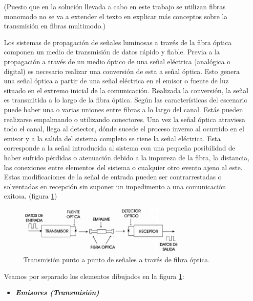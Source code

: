 \begin{itemize}
 (Puesto que en la solución llevada a cabo en este trabajo se utilizan fibras monomodo no se va a extender el texto en explicar más conceptos sobre la transmisión en fibras multimodo.)
 
 Los sistemas de propagación de señales luminosas a través de la fibra óptica componen un medio de transmisión de datos rápido y fiable. Previa a la propagación a través de un medio óptico de una señal eléctrica (analógica o digital) es necesario realizar una conversión de esta a señal óptica. Esto genera una señal óptica a partir de una señal eléctrica en el emisor o fuente de luz situado en el extremo inicial de la comunicación. Realizada la conversión, la señal es transmitida a lo largo de la fibra óptica. Según las características del escenario puede haber una o varias uniones entre fibras a lo largo del canal. Estás pueden realizarse empalmando o utilizando conectores. Una vez la señal óptica atraviesa todo el canal, llega al detector, dónde sucede el proceso inverso al ocurrido en el emisor y a la salida del sistema completo se tiene la señal eléctrica. Esta corresponde a la señal introducida al sistema con una pequeña posibilidad de haber sufrido pérdidas o atenuación debido a la impureza de la fibra, la distancia, las conexiones entre elementos del sistema o cualquier otro evento ajeno al este. Estas modificaciones de la señal de entrada pueden ser contrarrestadas o solventadas en recepción sin suponer un impedimento a una comunicación exitosa. (figura \ref{fig:TxFOp2p})
 
   \begin{figure}[H]
 	\centering
 	\includegraphics[width=0.75\textwidth]{./img/TxFOp2p}
 	\caption{Transmisión punto a punto de señales a través de fibra óptica. \cite{txFO} } 
 	\label{fig:TxFOp2p}
 	\end{figure} 

 Veamos por separado los elementos dibujados en la figura \ref{fig:TxFOp2p}:
 	\begin{itemize}
 		\item \textit{\textbf{Emisores (Transmisión)}}	
 		

\end{itemize}
\end{itemize}
